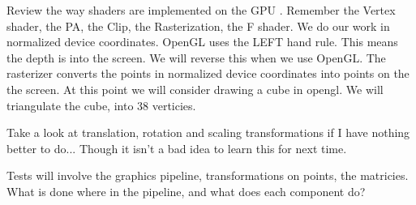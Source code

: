 \documentclass{article}
\begin{document}
Review the way shaders are implemented on the GPU . Remember the Vertex shader,
the PA, the Clip, the Rasterization, the F shader. We do our work in normalized
device coordinates. OpenGL uses the LEFT hand rule. This means the depth is into
the screen. We will reverse this when we use OpenGL. The rasterizer converts the
points in normalized device coordinates into points on the the screen. At this
point we will consider drawing a cube in opengl. We will triangulate the cube,
into 38 verticies. 

Take a look at translation, rotation and scaling transformations if I have
nothing better to do... Though it isn't a bad idea to learn this for next time.

Tests will involve the graphics pipeline, transformations on points, the
matricies. What is done where in the pipeline, and what does each component do? 
\end{document}
